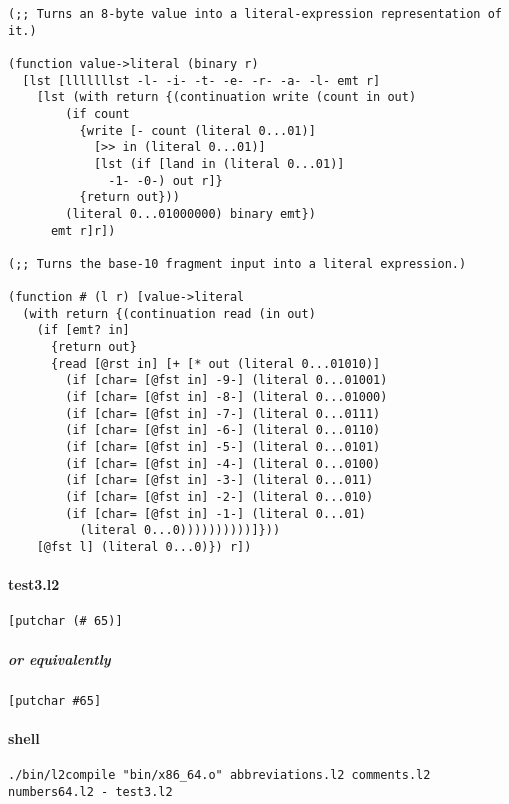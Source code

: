 \documentclass[]{article}
\let\oldparagraph\paragraph
\renewcommand{\paragraph}[1]{\oldparagraph{#1}\mbox{}}
\let\oldsubparagraph\subparagraph
\renewcommand{\subparagraph}[1]{\oldsubparagraph{#1}\mbox{}}
\begin{document}
\begin{verbatim}
(;; Turns an 8-byte value into a literal-expression representation of it.)

(function value->literal (binary r)
  [lst [lllllllst -l- -i- -t- -e- -r- -a- -l- emt r]
    [lst (with return {(continuation write (count in out)
        (if count
          {write [- count (literal 0...01)]
            [>> in (literal 0...01)]
            [lst (if [land in (literal 0...01)]
              -1- -0-) out r]}
          {return out}))
        (literal 0...01000000) binary emt})
      emt r]r])

(;; Turns the base-10 fragment input into a literal expression.)

(function # (l r) [value->literal
  (with return {(continuation read (in out)
    (if [emt? in]
      {return out}
      {read [@rst in] [+ [* out (literal 0...01010)]
        (if [char= [@fst in] -9-] (literal 0...01001)
        (if [char= [@fst in] -8-] (literal 0...01000)
        (if [char= [@fst in] -7-] (literal 0...0111)
        (if [char= [@fst in] -6-] (literal 0...0110)
        (if [char= [@fst in] -5-] (literal 0...0101)
        (if [char= [@fst in] -4-] (literal 0...0100)
        (if [char= [@fst in] -3-] (literal 0...011)
        (if [char= [@fst in] -2-] (literal 0...010)
        (if [char= [@fst in] -1-] (literal 0...01)
          (literal 0...0))))))))))]}))
    [@fst l] (literal 0...0)}) r])
\end{verbatim}

\paragraph{test3.l2}\label{test3.l2}

\begin{verbatim}
[putchar (# 65)]
\end{verbatim}

\subparagraph{or equivalently}\label{or-equivalently-1}

\begin{verbatim}
[putchar #65]
\end{verbatim}

\paragraph{shell}\label{shell-2}

\begin{verbatim}
./bin/l2compile "bin/x86_64.o" abbreviations.l2 comments.l2 numbers64.l2 - test3.l2
\end{verbatim}
\end{document}
